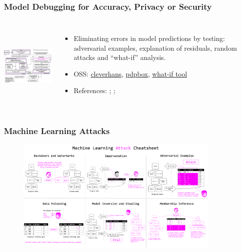 \documentclass[11pt,
               aspectratio=169,
               hyperref={colorlinks}
               ]{beamer}
\begin{document}
			\begin{frame}
		
				\frametitle{Model Debugging for Accuracy, Privacy or Security}		
			
				\begin{columns}
	
					\centering
					\includegraphics[height=120pt]{img/md.png}
				
					\vspace{-5pt}
					\scriptsize
					{\begin{itemize}
						\item Eliminating errors in model predictions by testing: adversarial examples, explanation of residuals, random attacks and ``what-if'' analysis.
						\item OSS: \href{https://github.com/tensorflow/cleverhans}{cleverhans}, \href{https://github.com/SauceCat/PDPbox}{pdpbox}, \href{https://pair-code.github.io/what-if-tool/index.html}{what-if tool}
						\item References: ; ; 
					\end{itemize}}
					\normalsize
				
				\end{columns}			
			
			\end{frame}
			
			\begin{frame}	
			
				\frametitle{Machine Learning Attacks}		
			
				\begin{figure}[htb]
					\begin{center}
						\includegraphics[height=160pt]{img/cheatsheet.png}
					\end{center}
				\end{figure}	
			\end{frame}
			
\end{document}

